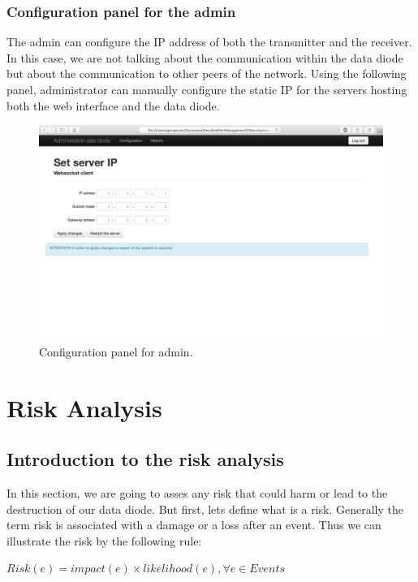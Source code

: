 \documentclass[a4paper,10pt]{article}
\begin{document}
\subsubsection{Configuration panel for the admin}
The admin can configure the IP address of both the transmitter and the receiver. In this case, we are not talking about the communication within the data diode but about the communication to other peers of the network. Using the following panel, administrator can manually configure the static IP for the servers hosting both the web interface and the data diode.\bigskip

\begin{figure}[!h]
\centering
\includegraphics[scale=0.35]{images/admin-config.png}
\caption{Configuration panel for admin.}
\label{fig:configadminpage}
\end{figure}

\newpage
\section{Risk Analysis}

\subsection{Introduction to the risk analysis}
In this section, we are going to asses any risk that could harm or lead to the destruction of our data diode. But first, lets define what is a risk. Generally the term risk is associated with a damage or a loss after an event. Thus we can illustrate the risk by the following rule:
\begin{center}
\centering
$Risk(e)= impact(e) \times likelihood(e), \forall e \in Events$
\end{center}
\end{document}
